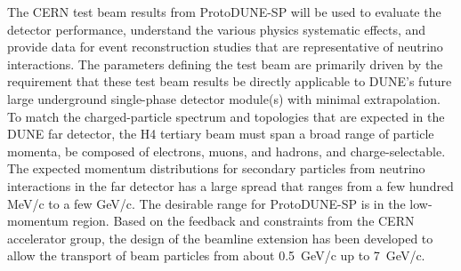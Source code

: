 The CERN test beam results from ProtoDUNE-SP will be used to evaluate the detector performance,  understand the various physics systematic effects, and provide data for event reconstruction studies that are representative of neutrino interactions. 
The parameters defining the test beam are primarily driven by the requirement that these test beam results be directly applicable to DUNE's future large underground single-phase detector module(s) with minimal extrapolation.
To match the charged-particle spectrum and topologies that are expected in the DUNE far detector, the H4 tertiary beam must span a broad range of particle momenta, be composed of electrons, muons, and hadrons, and charge-selectable. 
The expected momentum distributions for secondary particles from neutrino interactions in the far detector has a large spread that ranges from a few hundred MeV/c to a few GeV/c.
The desirable range for ProtoDUNE-SP is in the low-momentum region. Based on the feedback and constraints from the CERN accelerator group, the design of the beamline extension has been developed to allow the transport of beam particles from about 0.5~GeV/c up to 7~GeV/c. 

